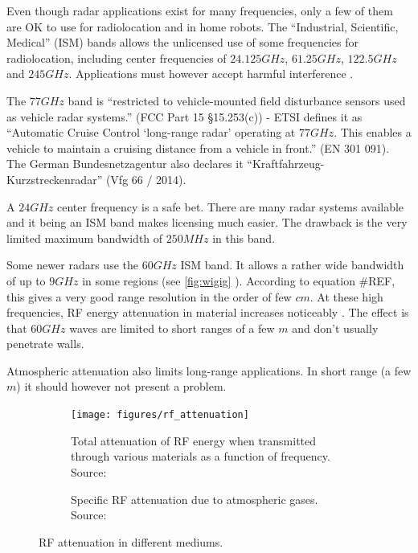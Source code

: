 Even though radar applications exist for many frequencies, only a few of
them are OK to use for radiolocation and in home robots. The
``Industrial, Scientific, Medical'' (ISM) bands allows the unlicensed
use of some frequencies for radiolocation, including center frequencies
of \(24.125 GHz\), \(61.25 GHz\), \(122.5 GHz\) and \(245 GHz\).
Applications must however accept harmful interference \cite{FCC2017}.

The \(77 GHz\) band is ``restricted to vehicle-mounted field disturbance
sensors used as vehicle radar systems.'' (FCC Part 15 §15.253(c)) - ETSI
defines it as ``Automatic Cruise Control `long-range radar' operating at
\(77 GHz\). This enables a vehicle to maintain a cruising distance from
a vehicle in front.'' (EN 301 091). The German Bundesnetzagentur also
declares it ``Kraftfahrzeug-Kurzstreckenradar'' (Vfg 66 / 2014).

A \(24 GHz\) center frequency is a safe bet. There are many radar
systems available and it being an ISM band makes licensing much easier.
The drawback is the very limited maximum bandwidth of \(250MHz\) in this
band.

Some newer radars use the \(60 GHz\) ISM band. It allows a rather wide
bandwidth of up to \(9GHz\) in some regions (see \cref{fig:wigig} ).
According to equation \#REF, this gives a very good range resolution in
the order of few \(cm\). At these high frequencies, RF energy
attenuation in material increases noticeably \cite{FerrisJr.1998}. The
effect is that \(60GHz\) waves are limited to short ranges of a few
\(m\) and don't usually penetrate walls.

Atmospheric attenuation also limits long-range applications. In short
range (a few \(m\)) it should however not present a problem.

\begin{figure}[htp]
    \centering
    \begin{subfigure}[b]{0.475\textwidth}
        \texttt{[image: figures/rf\_attenuation]}
        \caption{\label{fig:attenuation}Total attenuation of RF energy when transmitted through various materials as a function of frequency. Source: \cite{FerrisJr.1998}}
    \end{subfigure}
    \hfill
    \begin{subfigure}[b]{0.475\textwidth}
        \def\svgwidth{\linewidth} \footnotesize
        
        \caption{\label{fig:attenuation_air}Specific RF attenuation due to atmospheric gases. Source: \cite{ITU1997}\bigskip}
    \end{subfigure}
    \caption{RF attenuation in different mediums.}
\end{figure}

